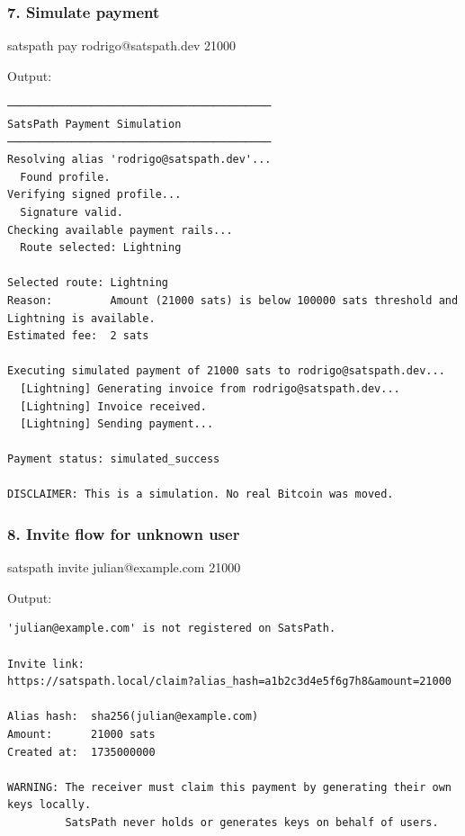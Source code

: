 \documentclass[
]{article}
\newenvironment{Shaded}{}{}
\newcommand{\ExtensionTok}[1]{#1}
\newcommand{\NormalTok}[1]{#1}
\begin{document}
\hypertarget{simulate-payment}{%
\subsubsection{7. Simulate payment}\label{simulate-payment}}

\begin{Shaded}
\begin{Highlighting}[]
\ExtensionTok{satspath}\NormalTok{ pay rodrigo@satspath.dev 21000}
\end{Highlighting}
\end{Shaded}

Output:

\begin{verbatim}
─────────────────────────────────────────
SatsPath Payment Simulation
─────────────────────────────────────────
Resolving alias 'rodrigo@satspath.dev'...
  Found profile.
Verifying signed profile...
  Signature valid.
Checking available payment rails...
  Route selected: Lightning

Selected route: Lightning
Reason:         Amount (21000 sats) is below 100000 sats threshold and Lightning is available.
Estimated fee:  2 sats

Executing simulated payment of 21000 sats to rodrigo@satspath.dev...
  [Lightning] Generating invoice from rodrigo@satspath.dev...
  [Lightning] Invoice received.
  [Lightning] Sending payment...

Payment status: simulated_success

DISCLAIMER: This is a simulation. No real Bitcoin was moved.
\end{verbatim}

\hypertarget{invite-flow-for-unknown-user}{%
\subsubsection{8. Invite flow for unknown
user}\label{invite-flow-for-unknown-user}}

\begin{Shaded}
\begin{Highlighting}[]
\ExtensionTok{satspath}\NormalTok{ invite julian@example.com 21000}
\end{Highlighting}
\end{Shaded}

Output:

\begin{verbatim}
'julian@example.com' is not registered on SatsPath.

Invite link:
https://satspath.local/claim?alias_hash=a1b2c3d4e5f6g7h8&amount=21000

Alias hash:  sha256(julian@example.com)
Amount:      21000 sats
Created at:  1735000000

WARNING: The receiver must claim this payment by generating their own keys locally.
         SatsPath never holds or generates keys on behalf of users.
\end{verbatim}
\end{document}
